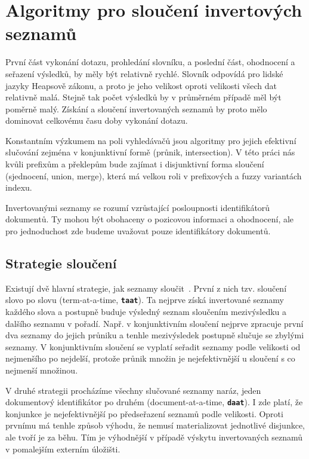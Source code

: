 \documentclass[11pt,letterpaper,oneside,openright]{book}
\newcommand{\bftt}[1]{\texttt{\textbf{#1}}}
\begin{document}
\section{Algoritmy pro sloučení invertových seznamů}
První část vykonání dotazu, prohledání slovníku, a poslední část, ohodnocení a
seřazení výsledků, by měly být relativně rychlé. Slovník odpovídá pro lidské
jazyky Heapsově zákonu, a proto je jeho velikost oproti velikosti všech dat
relativně malá.  Stejně tak počet výsledků by v průměrném případě měl být
poměrně malý. Získání a sloučení invertovaných seznamů by proto mělo dominovat
celkovému času doby vykonání dotazu.

Konstantním výzkumem na poli vyhledávačů jsou algoritmy pro jejich efektivní
slučování zejména v konjunktivní formě (průnik, intersection). V této práci nás
kvůli prefixům a překlepům bude zajímat i disjunktivní forma sloučení
(sjednocení, union, merge), která má velkou roli v prefixových a fuzzy
variantách indexu.

Invertovanými seznamy se rozumí vzrůstající posloupnosti identifikátorů
dokumentů. Ty mohou být obohaceny o pozicovou informaci a ohodnocení, ale pro
jednoduchost zde budeme uvažovat pouze identifikátory dokumentů.

\subsection{Strategie sloučení}
Existují dvě hlavní strategie, jak seznamy
sloučit~\cite{Lacour_efficiencycomparison}. První z nich tzv. sloučení slovo po
slovu (term-at-a-time, \bftt{taat}). Ta nejprve získá invertované seznamy
každého slova a postupně buduje výsledný seznam sloučením mezivýsledku a
dalšího seznamu v pořadí. Např. v konjunktivním sloučení nejprve zpracuje první
dva seznamy do jejich průniku a tenhle mezivýsledek postupně slučuje se zbylými
seznamy. V konjunktivním sloučení se vyplatí seřadit seznamy podle velikosti od
nejmenšího po nejdelší, protože průnik množin je nejefektivnější u sloučení s
co nejmenší množinou.

V druhé strategii procházíme všechny slučované seznamy naráz, jeden dokumentový
identifikátor po druhém (document-at-a-time, \bftt{daat}). I zde platí, že
konjunkce je nejefektivnější po předseřazení seznamů podle velikosti. Oproti
prvnímu má tenhle způsob výhodu, že nemusí materializovat jednotlivé disjunkce,
ale tvoří je za běhu. Tím je výhodnější v případě výskytu invertovaných seznamů
v pomalejším externím úložišti.
\end{document}
